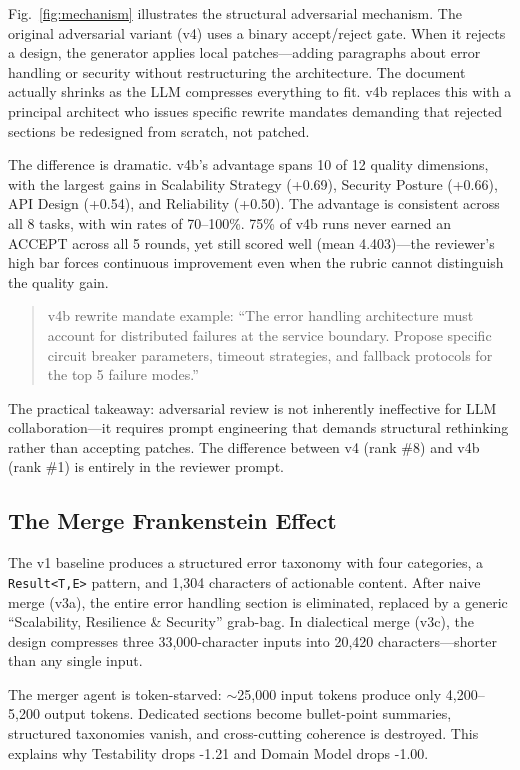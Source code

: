 \documentclass[conference]{IEEEtran}
\begin{document}
Fig.~\ref{fig:mechanism} illustrates the structural adversarial mechanism. The original adversarial variant (v4) uses a binary accept/reject gate. When it rejects a design, the generator applies local patches---adding paragraphs about error handling or security without restructuring the architecture. The document actually shrinks as the LLM compresses everything to fit. v4b replaces this with a principal architect who issues specific rewrite mandates demanding that rejected sections be redesigned from scratch, not patched.

The difference is dramatic. v4b's advantage spans 10 of 12 quality dimensions, with the largest gains in Scalability Strategy (+0.69), Security Posture (+0.66), API Design (+0.54), and Reliability (+0.50). The advantage is consistent across all 8 tasks, with win rates of 70--100\%. 75\% of v4b runs never earned an ACCEPT across all 5 rounds, yet still scored well (mean 4.403)---the reviewer's high bar forces continuous improvement even when the rubric cannot distinguish the quality gain.

\begin{quote}
v4b rewrite mandate example: ``The error handling architecture must account for distributed failures at the service boundary. Propose specific circuit breaker parameters, timeout strategies, and fallback protocols for the top 5 failure modes.''
\end{quote}

The practical takeaway: adversarial review is not inherently ineffective for LLM collaboration---it requires prompt engineering that demands structural rethinking rather than accepting patches. The difference between v4 (rank \#8) and v4b (rank \#1) is entirely in the reviewer prompt.

\subsection{The Merge Frankenstein Effect}

The v1 baseline produces a structured error taxonomy with four categories, a \texttt{Result<T,E>} pattern, and 1,304 characters of actionable content. After naive merge (v3a), the entire error handling section is eliminated, replaced by a generic ``Scalability, Resilience \& Security'' grab-bag. In dialectical merge (v3c), the design compresses three 33,000-character inputs into 20,420 characters---shorter than any single input.

The merger agent is token-starved: $\sim$25,000 input tokens produce only 4,200--5,200 output tokens. Dedicated sections become bullet-point summaries, structured taxonomies vanish, and cross-cutting coherence is destroyed. This explains why Testability drops -1.21 and Domain Model drops -1.00.
\end{document}
